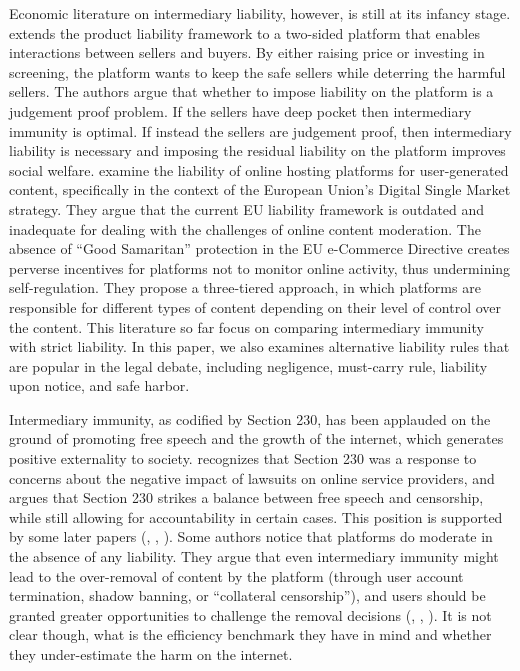 Economic literature on intermediary liability, however, is still at its infancy stage. 
\cite{hua2021holding} extends the product liability framework to a two-sided platform that enables interactions between sellers and buyers. By either raising price or investing in screening, the platform wants to keep the safe sellers while deterring the harmful sellers. The authors argue that whether to impose liability on the platform is a judgement proof problem. If the sellers have deep pocket then intermediary immunity is optimal. If instead the sellers are judgement proof, then intermediary liability is necessary and imposing the residual liability on the platform improves social welfare.  
\cite{buiten2020rethinking} examine the liability of online hosting platforms for user-generated content, specifically in the context of the European Union's Digital Single Market strategy. They argue that the current EU liability framework is outdated and inadequate for dealing with the challenges of online content moderation. The absence of ``Good Samaritan'' protection in the EU e-Commerce Directive creates perverse incentives for platforms not to monitor online activity, thus undermining self-regulation. 
They propose a three-tiered approach, in which platforms are responsible for different types of content depending on their level of control over the content. 
This literature so far focus on comparing intermediary immunity with strict liability. In this paper, we also examines alternative liability rules that are popular in the legal debate, including negligence, must-carry rule, liability upon notice, and safe harbor. 




Intermediary immunity, as codified by Section 230, has been applauded on the ground of promoting free speech and the growth of the internet, which generates positive externality to society. \cite{ehrlich2002commuications} recognizes that Section 230 was a response to concerns about the negative impact of lawsuits on online service providers, and argues that Section 230 strikes a balance between free speech and censorship, while still allowing for accountability in certain cases. This position is supported by some later papers (\cite{ziniti2008optimal}, \cite{sanchez2008web}, \cite{kosseff2010defending}).
Some authors notice that platforms do moderate in the absence of any liability. They argue that even intermediary immunity might lead to the over-removal of content by the platform (through user account termination, shadow banning, or ``collateral censorship''), and users should be granted greater opportunities to challenge the removal decisions (\cite{ciolli2008chilling}, \cite{goldman2012online}, \cite{wucollateral}). It is not clear though, what is the efficiency benchmark they have in mind and whether they under-estimate the harm on the internet.

